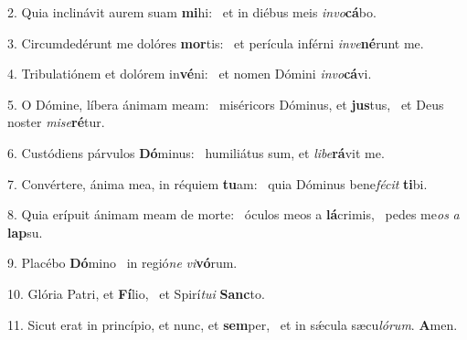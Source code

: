 2. Quia inclinávit aurem suam \textbf{mi}hi: \ast\  et in diébus meis \textit{in}\textit{vo}\textbf{cá}bo.\

3. Circumdedérunt me dolóres \textbf{mor}tis: \ast\  et perícula inférni \textit{in}\textit{ve}\textbf{né}runt me.\

4. Tribulatiónem et dolórem in\textbf{vé}ni: \ast\  et nomen Dómini \textit{in}\textit{vo}\textbf{cá}vi.\

5. O Dómine, líbera ánimam meam: \dag\  miséricors Dóminus, et \textbf{jus}tus, \ast\  et Deus noster \textit{mi}\textit{se}\textbf{ré}tur.\

6. Custódiens párvulos \textbf{Dó}minus: \ast\  humiliátus sum, et \textit{li}\textit{be}\textbf{rá}vit me.\

7. Convértere, ánima mea, in réquiem \textbf{tu}am: \ast\  quia Dóminus bene\textit{fé}\textit{cit} \textbf{ti}bi.\

8. Quia erípuit ánimam meam de morte: \dag\  óculos meos a \textbf{lá}crimis, \ast\  pedes me\textit{os} \textit{a} \textbf{lap}su.\

9. Placébo \textbf{Dó}mino \ast\  in regió\textit{ne} \textit{vi}\textbf{vó}rum.\

10. Glória Patri, et \textbf{Fí}lio, \ast\  et Spirí\textit{tu}\textit{i} \textbf{Sanc}to.\

11. Sicut erat in princípio, et nunc, et \textbf{sem}per, \ast\  et in sǽcula sæcu\textit{ló}\textit{rum}. \textbf{A}men.\

